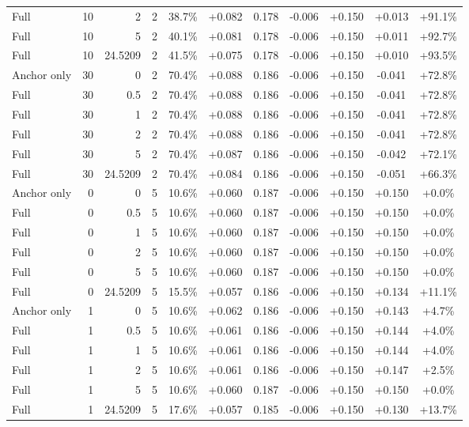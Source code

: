\begin{table}[htbp]
\begin{tabular}{lrrrccccccc}
Full & 10 & 2 & 2 & 38.7\% & +0.082 & 0.178 & -0.006 & +0.150 & +0.013 & +91.1\% \\
Full & 10 & 5 & 2 & 40.1\% & +0.081 & 0.178 & -0.006 & +0.150 & +0.011 & +92.7\% \\
Full & 10 & 24.5209 & 2 & 41.5\% & +0.075 & 0.178 & -0.006 & +0.150 & +0.010 & +93.5\% \\
Anchor only & 30 & 0 & 2 & 70.4\% & +0.088 & 0.186 & -0.006 & +0.150 & -0.041 & +72.8\% \\
Full & 30 & 0.5 & 2 & 70.4\% & +0.088 & 0.186 & -0.006 & +0.150 & -0.041 & +72.8\% \\
Full & 30 & 1 & 2 & 70.4\% & +0.088 & 0.186 & -0.006 & +0.150 & -0.041 & +72.8\% \\
Full & 30 & 2 & 2 & 70.4\% & +0.088 & 0.186 & -0.006 & +0.150 & -0.041 & +72.8\% \\
Full & 30 & 5 & 2 & 70.4\% & +0.087 & 0.186 & -0.006 & +0.150 & -0.042 & +72.1\% \\
Full & 30 & 24.5209 & 2 & 70.4\% & +0.084 & 0.186 & -0.006 & +0.150 & -0.051 & +66.3\% \\
Anchor only & 0 & 0 & 5 & 10.6\% & +0.060 & 0.187 & -0.006 & +0.150 & +0.150 & +0.0\% \\
Full & 0 & 0.5 & 5 & 10.6\% & +0.060 & 0.187 & -0.006 & +0.150 & +0.150 & +0.0\% \\
Full & 0 & 1 & 5 & 10.6\% & +0.060 & 0.187 & -0.006 & +0.150 & +0.150 & +0.0\% \\
Full & 0 & 2 & 5 & 10.6\% & +0.060 & 0.187 & -0.006 & +0.150 & +0.150 & +0.0\% \\
Full & 0 & 5 & 5 & 10.6\% & +0.060 & 0.187 & -0.006 & +0.150 & +0.150 & +0.0\% \\
Full & 0 & 24.5209 & 5 & 15.5\% & +0.057 & 0.186 & -0.006 & +0.150 & +0.134 & +11.1\% \\
Anchor only & 1 & 0 & 5 & 10.6\% & +0.062 & 0.186 & -0.006 & +0.150 & +0.143 & +4.7\% \\
Full & 1 & 0.5 & 5 & 10.6\% & +0.061 & 0.186 & -0.006 & +0.150 & +0.144 & +4.0\% \\
Full & 1 & 1 & 5 & 10.6\% & +0.061 & 0.186 & -0.006 & +0.150 & +0.144 & +4.0\% \\
Full & 1 & 2 & 5 & 10.6\% & +0.061 & 0.186 & -0.006 & +0.150 & +0.147 & +2.5\% \\
Full & 1 & 5 & 5 & 10.6\% & +0.060 & 0.187 & -0.006 & +0.150 & +0.150 & +0.0\% \\
Full & 1 & 24.5209 & 5 & 17.6\% & +0.057 & 0.185 & -0.006 & +0.150 & +0.130 & +13.7\% \\

\end{tabular}
\end{table}
